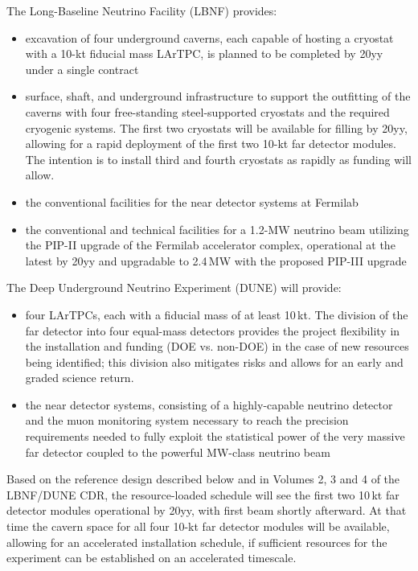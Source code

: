 The Long-Baseline Neutrino Facility (LBNF) provides:
\begin{itemize}
\item excavation of four underground caverns, each capable of hosting a cryostat 
with a 10-kt fiducial mass LArTPC, is planned to be completed 
by 20yy %
under a single contract

\item surface, shaft, and underground infrastructure to support 
the outfitting of the caverns with four free-standing steel-supported cryostats 
and the required cryogenic systems. The first two cryostats will be available for filling by
20yy, %
allowing for a rapid deployment of the first two 10-kt far detector modules. 
The intention is to install third and fourth cryostats as rapidly as funding will 
allow.

\item  the conventional facilities for the near detector systems at Fermilab 

\item  the conventional and technical facilities for a 1.2-MW neutrino beam utilizing the PIP-II upgrade of the Fermilab accelerator 
complex, operational at the latest by 20yy %
and upgradable to 2.4\,MW with the proposed 
PIP-III upgrade
\end{itemize}

The Deep Underground Neutrino Experiment (DUNE) will provide:
\begin{itemize}

\item four LArTPCs, each with a fiducial mass of at least 10\,kt. The division of 
the far detector into four equal-mass detectors provides the project flexibility 
in the installation and funding (DOE vs. non-DOE) in the case of new resources being 
identified; this division also mitigates risks and allows for an early and graded science return.

\item the near detector systems, consisting of a highly-capable neutrino detector 
and the muon monitoring system necessary to reach the precision requirements needed to fully 
exploit the statistical power of the very massive far detector coupled to the powerful MW-class 
neutrino beam

\end{itemize}

Based on the reference design described below and in Volumes 2, 3 and 4 of the LBNF/DUNE 
CDR, the resource-loaded schedule will see the first two 10\,kt far detector modules 
operational by 20yy, %
with first beam shortly afterward. At that time the cavern 
space for all four 10-kt far detector modules will be available, allowing for 
an accelerated installation schedule, if sufficient resources for
the experiment can be established on an accelerated timescale.  

